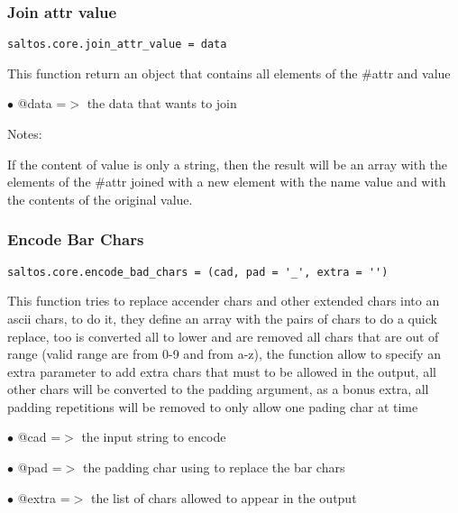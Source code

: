 \documentclass[a4paper]{article}
\begin{document}
\hypertarget{toc712}{}
\subsubsection{Join attr value}

\begin{lstlisting}
saltos.core.join_attr_value = data
\end{lstlisting}

This function return an object that contains all elements of the \#attr and value

\begin{compactitem}
\item[\color{myblue}$\bullet$] @data =$>$ the data that wants to join
\end{compactitem}

Notes:

If the content of value is only a string, then the result will be an array with the
elements of the \#attr joined with a new element with the name value and with the contents
of the original value.

\hypertarget{toc713}{}
\subsubsection{Encode Bar Chars}

\begin{lstlisting}
saltos.core.encode_bad_chars = (cad, pad = '_', extra = '')
\end{lstlisting}

This function tries to replace accender chars and other extended chars into
an ascii chars, to do it, they define an array with the pairs of chars to
do a quick replace, too is converted all to lower and are removed all chars
that are out of range (valid range are from 0-9 and from a-z), the function
allow to specify an extra parameter to add extra chars that must to be
allowed in the output, all other chars will be converted to the padding
argument, as a bonus extra, all padding repetitions will be removed to
only allow one pading char at time

\begin{compactitem}
\item[\color{myblue}$\bullet$] @cad   =$>$ the input string to encode
\item[\color{myblue}$\bullet$] @pad   =$>$ the padding char using to replace the bar chars
\item[\color{myblue}$\bullet$] @extra =$>$ the list of chars allowed to appear in the output
\end{compactitem}
\end{document}
